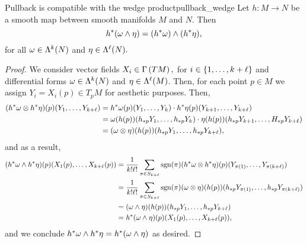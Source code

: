\begin{proposition}{Pullback is compatible with the wedge product}{pullback_wedge}
    Let \(h : M \to N\) be a smooth map between smooth manifolds \(M\) and \(N\). Then
    \begin{equation*}
        \pb{h}(\omega \wedge \eta) = (\pb{h}\omega) \wedge (\pb{h}\eta),
    \end{equation*}
    for all \(\omega \in \forms[k]{N}\) and \(\eta \in \forms[\ell]{N}.\)
\end{proposition}
\begin{proof}
    We consider vector fields \(X_i \in \sections{TM},\) for \(i \in \set{1, \dots, k+\ell}\) and differential forms \(\omega \in \forms[k]{N}\) and \(\eta\in\forms[\ell]{M}\). Then, for each point \(p \in M\) we assign \(Y_i = X_i(p) \in T_pM\) for aesthetic purposes. Then,
    \begin{align*}
        (\pb{h}\omega \otimes \pb{h}\eta)(p)(Y_1, \dots, Y_{k+\ell}) &= \pb{h}\omega(p)(Y_1, \dots, Y_{k})\cdot \pb{h}\eta(p)(Y_{k+1}, \dots, Y_{k+\ell})\\
                                                                     &= \omega(h(p))(\pf[p]{h}Y_1, \dots, \pf[p]{h}Y_k)\cdot \eta(h(p))(\pf[p]{h}Y_{k+1}, \dots, \pf[p]{H}Y_{k+\ell})\\
                                                                     &= (\omega \otimes \eta)(h(p))(\pf[p]{h}Y_1, \dots, \pf[p]{h}Y_{k+\ell}),
    \end{align*}
    and as a result,
    \begin{align*}
        (\pb{h}\omega\wedge\pb{h}\eta)(p)(X_1(p), \dots, X_{k+\ell}(p)) &= \frac{1}{k!\ell!} \sum_{\pi \in S_{k+\ell}} \sgn(\pi) (\pb{h}\omega \otimes \pb{h}\eta)(p) (Y_{\pi(1)}, \dots, Y_{\pi(k+\ell)})\\
                                                                  &= \frac{1}{k!\ell!} \sum_{\pi \in S_{k+\ell}} \sgn(\pi) (\omega \otimes \eta)(h(p)) (\pf[p]{h}Y_{\pi(1)}, \dots, \pf[p]{h}Y_{\pi(k+\ell)})\\
                                                                  &= (\omega \wedge \eta)(h(p))(\pf[p]{h}Y_1, \dots, \pf[p]{h}Y_{k+\ell})\\
                                                                  &= \pb{h}(\omega\wedge \eta )(p)(X_1(p), \dots, X_{k+\ell}(p)),
    \end{align*}
    and we conclude \(\pb{h}\omega \wedge \pb{h}\eta = \pb{h}(\omega\wedge \eta)\) as desired.
\end{proof}

